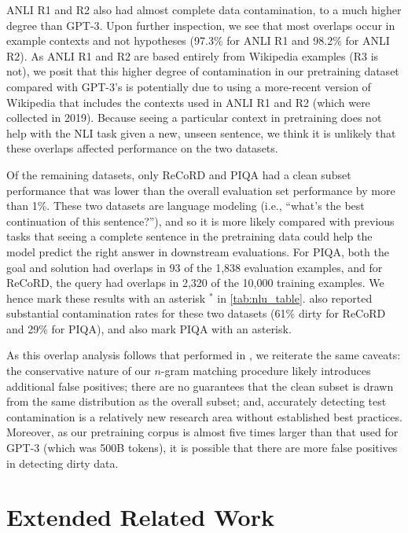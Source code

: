 \documentclass{article} %
\begin{document}
ANLI R1 and R2 \citep{anli} also had almost complete data contamination, to a much higher degree than GPT-3. 
Upon further inspection, we see that most overlaps occur in example contexts and not hypotheses (97.3\% for ANLI R1 and 98.2\% for ANLI R2). 
As ANLI R1 and R2 are based entirely from Wikipedia examples (R3 is not), we posit that this higher degree of contamination in our pretraining dataset compared with GPT-3's is potentially due to using a more-recent version of Wikipedia that includes the contexts used in ANLI R1 and R2 (which were collected in 2019). 
Because seeing a particular context in pretraining does not help with the NLI task given a new, unseen sentence, we think it is unlikely that these overlaps affected performance on the two datasets.

Of the remaining datasets, only ReCoRD and PIQA had a clean subset performance that was lower than the overall evaluation set performance by more than 1\%. 
These two datasets are language modeling (i.e., ``what's the best continuation of this sentence?''), and so it is more likely compared with previous tasks that seeing a complete sentence in the pretraining data could help the model predict the right answer in downstream evaluations.
For PIQA, both the goal and solution had overlaps in 93 of the 1,838 evaluation examples, and for ReCoRD, the query had overlaps in 2,320 of the 10,000 training examples.
We hence mark these results with an asterisk $^*$ in \cref{tab:nlu_table}.
\citet{brown2020language} also reported substantial contamination rates for these two datasets (61\% dirty for ReCoRD and 29\% for PIQA), and also mark PIQA with an asterisk.

As this overlap analysis follows that performed in \citet{brown2020language}, we reiterate the same caveats: the conservative nature of our $n$-gram matching procedure likely introduces additional false positives; there are no guarantees that the clean subset is drawn from the same distribution as the overall subset; and, accurately detecting test contamination is a relatively new research area without established best practices.
Moreover, as our pretraining corpus is almost five times larger than that used for GPT-3 (which was 500B tokens), it is possible that there are more false positives in detecting dirty data.



\clearpage 
\section{Extended Related Work}\label{sec:extended_related_work}
\end{document}
